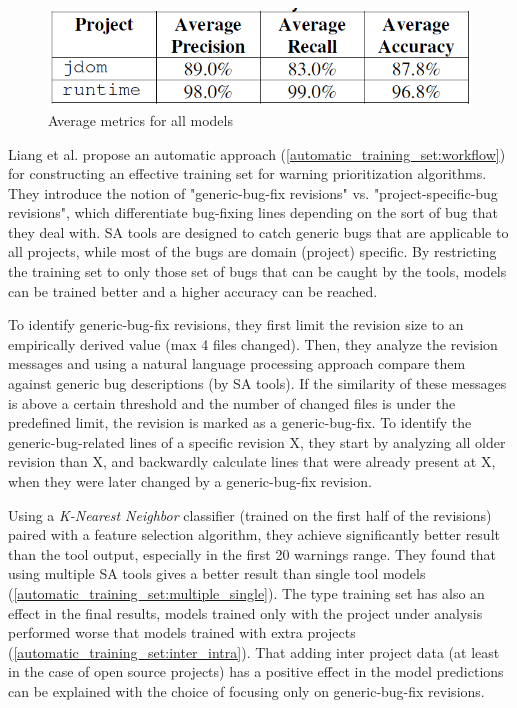  \begin{figure}[H]
     \centering
     \includegraphics[scale=0.3]{./src/model_building_results.png}
     \caption{Average metrics for all models}\label{model_building:results}
 \end{figure}


 Liang et al. \cite{automatic_training_set} propose an automatic approach (\cref{automatic_training_set:workflow}) for constructing an effective training set for warning prioritization algorithms. They introduce the notion of "generic-bug-fix revisions" vs. "project-specific-bug revisions", which differentiate bug-fixing lines depending on the sort of bug that they deal with. SA tools are designed to catch generic bugs that are applicable to all projects, while most of the bugs are domain (project) specific. By restricting the training set to only those set of bugs that can be caught by the tools, models can be trained better and a higher accuracy can be reached.

 To identify generic-bug-fix revisions, they first limit the revision size to an empirically derived value (max 4 files changed). Then, they analyze the revision messages and using a natural language processing approach compare them against generic bug descriptions (by SA tools). If the similarity of these messages is above a certain threshold and the number of changed files is under the predefined limit, the revision is marked as a generic-bug-fix. To identify the generic-bug-related lines of a specific revision X, they start by analyzing all older revision than X, and backwardly calculate lines that were already present at X, when they were later changed by a generic-bug-fix revision.

 Using a \textit{K-Nearest Neighbor} classifier (trained on the first half of the revisions) paired with a feature selection algorithm, they achieve significantly better result than the tool output, especially in the first 20 warnings range. They found that using multiple SA tools gives a better result than single tool models (\cref{automatic_training_set:multiple_single}). The type training set has also an effect in the final results, models trained only with the project under analysis performed worse that models trained with extra projects (\cref{automatic_training_set:inter_intra}). That adding inter project data (at least in the case of open source projects) has a positive effect in the model predictions can be explained with the choice of focusing only on generic-bug-fix revisions.

